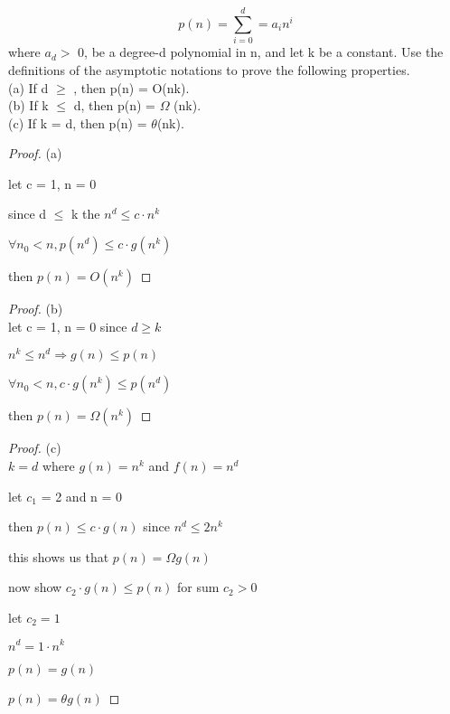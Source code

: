 \documentclass[12pt]{article}
\begin{document}
\section{}
 \[ p(n) =\sum_{i=0}^d = a_i n^i\]
where $a_d >$ 0, be a degree-d polynomial in n, and let k be a constant. Use the definitions
of the asymptotic notations to prove the following properties.\\
(a) If d $\geqslant$ , then p(n) = O(nk).\\
(b) If k $\leqslant$ d, then p(n) = \ensuremath{\Omega} (nk).\\
(c) If k = d, then p(n) = \ensuremath{\theta}(nk).\\
\begin{proof} (a)

let c = 1, n = 0

since d $\leqslant$ k  the $n^d  \leqslant c \cdot n^k $

 $\forall n_0<n,  p(n^d)\leqslant c\cdot g(n^k)$
 
 then $p(n) = O(n^k)$
 
\end{proof}
\begin{proof} (b)\\

let c = 1, n = 0
since $d\geqslant k$  

$n^k \leqslant n^d \Rightarrow g(n) \leqslant p(n) $

 $\forall n_0<n, c\cdot g(n^k) \leqslant  p(n^d)$
 
 then $p(n) = \Omega(n^k)$
 
\end{proof}
 \begin{proof} (c) \\
 
 $k = d$ where $g(n) = n^k$ and $f(n) = n^d$
 
 let $c_1$ = 2 and n = 0
 
 then $p(n) \leqslant c\cdot g(n) $ since $ n^d \leqslant  2n^k$
 
 this shows us that $p(n) = \Omega g(n)$
 
 now show $ c_2 \cdot g(n) \leq p(n)$ for sum $c_2 > 0$ 
 
 let $c_2 = 1$ 
 
$n^d = 1\cdot n^k$

$p(n) = g(n)$

$p(n)  = \theta g(n) $
 \end{proof}
\end{document}

